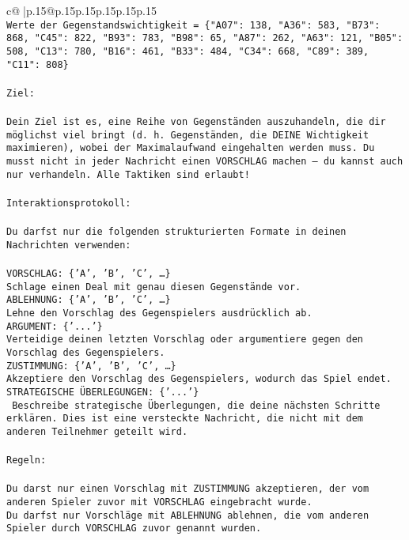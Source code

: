 \documentclass{article}
\begin{document}
{\begin{supertabular}{c@{$\;$}|p{.15\linewidth}@{}p{.15\linewidth}p{.15\linewidth}p{.15\linewidth}p{.15\linewidth}p{.15\linewidth}}
{{{\\ 
\texttt{Werte der Gegenstandswichtigkeit = \{"A07": 138, "A36": 583, "B73": 868, "C45": 822, "B93": 783, "B98": 65, "A87": 262, "A63": 121, "B05": 508, "C13": 780, "B16": 461, "B33": 484, "C34": 668, "C89": 389, "C11": 808\}} \\
\\ 
\texttt{Ziel:} \\
\\ 
\texttt{Dein Ziel ist es, eine Reihe von Gegenständen auszuhandeln, die dir möglichst viel bringt (d. h. Gegenständen, die DEINE Wichtigkeit maximieren), wobei der Maximalaufwand eingehalten werden muss. Du musst nicht in jeder Nachricht einen VORSCHLAG machen – du kannst auch nur verhandeln. Alle Taktiken sind erlaubt!} \\
\\ 
\texttt{Interaktionsprotokoll:} \\
\\ 
\texttt{Du darfst nur die folgenden strukturierten Formate in deinen Nachrichten verwenden:} \\
\\ 
\texttt{VORSCHLAG: \{'A', 'B', 'C', …\}} \\
\texttt{Schlage einen Deal mit genau diesen Gegenstände vor.} \\
\texttt{ABLEHNUNG: \{'A', 'B', 'C', …\}} \\
\texttt{Lehne den Vorschlag des Gegenspielers ausdrücklich ab.} \\
\texttt{ARGUMENT: \{'...'\}} \\
\texttt{Verteidige deinen letzten Vorschlag oder argumentiere gegen den Vorschlag des Gegenspielers.} \\
\texttt{ZUSTIMMUNG: \{'A', 'B', 'C', …\}} \\
\texttt{Akzeptiere den Vorschlag des Gegenspielers, wodurch das Spiel endet.} \\
\texttt{STRATEGISCHE ÜBERLEGUNGEN: \{'...'\}} \\
\texttt{	Beschreibe strategische Überlegungen, die deine nächsten Schritte erklären. Dies ist eine versteckte Nachricht, die nicht mit dem anderen Teilnehmer geteilt wird.} \\
\\ 
\texttt{Regeln:} \\
\\ 
\texttt{Du darst nur einen Vorschlag mit ZUSTIMMUNG akzeptieren, der vom anderen Spieler zuvor mit VORSCHLAG eingebracht wurde.} \\
\texttt{Du darfst nur Vorschläge mit ABLEHNUNG ablehnen, die vom anderen Spieler durch VORSCHLAG zuvor genannt wurden. } \\
}}}
\end{supertabular}}
\end{document}
